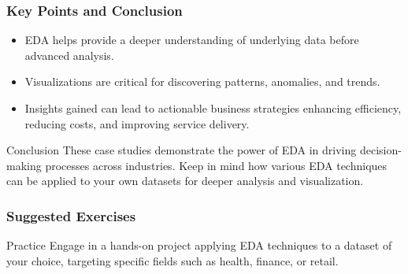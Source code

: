\documentclass[aspectratio=169]{beamer}
\begin{document}
\begin{frame}[fragile]
    \frametitle{Key Points and Conclusion}
    \begin{itemize}
        \item EDA helps provide a deeper understanding of underlying data before advanced analysis.
        \item Visualizations are critical for discovering patterns, anomalies, and trends.
        \item Insights gained can lead to actionable business strategies enhancing efficiency, reducing costs, and improving service delivery.
    \end{itemize}

    \begin{block}{Conclusion}
        These case studies demonstrate the power of EDA in driving decision-making processes across industries. Keep in mind how various EDA techniques can be applied to your own datasets for deeper analysis and visualization.
    \end{block}
\end{frame}

\begin{frame}[fragile]
    \frametitle{Suggested Exercises}
    \begin{block}{Practice}
        Engage in a hands-on project applying EDA techniques to a dataset of your choice, targeting specific fields such as health, finance, or retail.
    \end{block}
\end{frame}
\end{document}
